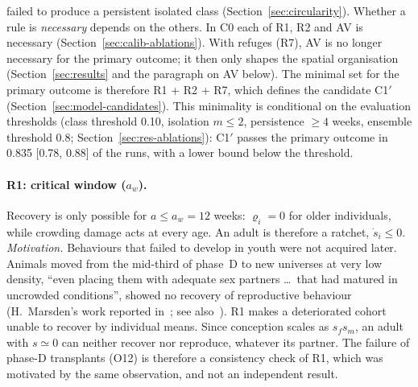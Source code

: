 failed to produce a persistent isolated class (Section~\ref{sec:circularity}). Whether a rule is \emph{necessary} depends on
the others. In \textsf{C0} each of R1, R2 and AV is necessary (Section~\ref{sec:calib-ablations}). With
refuges (R7), AV is no longer necessary for the primary outcome; it then only shapes the spatial
organisation (Section~\ref{sec:results} and the paragraph on AV below). The minimal set for the primary
outcome is therefore R1 + R2 + R7, which defines the candidate \textsf{C1$'$} (Section~\ref{sec:model-candidates}).
This minimality is conditional on the evaluation thresholds (class threshold 0.10, isolation $m\le2$, persistence
$\ge4$ weeks, ensemble threshold 0.8; Section~\ref{sec:res-ablations}): \textsf{C1$'$} passes the primary outcome in
0.835 [0.78, 0.88] of the runs, with a lower bound below the threshold.

\paragraph{R1: critical window ($a_w$).}
Recovery is only possible for $a\le a_w=12$ weeks: $\varrho_i=0$ for older individuals, while crowding
damage acts at every age. An adult is therefore a ratchet, $\dot s_i\le0$.
\emph{Motivation.} Behaviours that failed to develop in youth were not acquired later. Animals moved from
the mid-third of phase~D to new universes at very low density, ``even placing them with adequate sex
partners \dots\ that had matured in uncrowded conditions'', showed no recovery of reproductive behaviour
(H.~Marsden's work reported in~\cite{Calhoun1973}; see also~\cite{Marsden1972}). R1 makes a deteriorated
cohort unable to recover by individual means. Since conception scales as $s_fs_m$, an adult with $s\simeq0$ can
neither recover nor reproduce, whatever its partner. The failure of phase-D transplants (O12) is therefore a
consistency check of R1, which was motivated by the same observation, and not an independent result.

